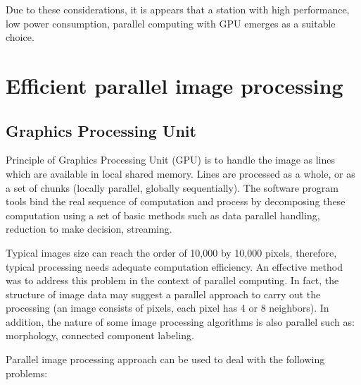 \documentclass[10pt,a4paper]{article}
\begin{document}
Due to these considerations, it is appears that a station with high performance, low power consumption, parallel computing with GPU emerges as a suitable choice.

\section {Efficient parallel image processing }

\subsection {Graphics Processing Unit}

Principle of Graphics Processing Unit (GPU) is to handle the image as lines which are available in local shared memory. Lines are processed as a whole, or as a set of chunks (locally parallel, globally sequentially). The software program tools bind the real sequence of computation and process by decomposing these computation using a set of basic methods such as data parallel handling, reduction to make decision, streaming.

\label{Applications}
Typical images size can reach the order of 10,000 by 10,000 pixels, therefore, typical processing needs adequate computation efficiency. 
An effective method was to address this problem in the context of parallel computing. 
In fact, the structure of image data may suggest a parallel approach to carry out the processing (an image consists of pixels, each pixel has 4 or 8 neighbors). 
In addition, the nature of some image processing algorithms is also parallel such as: morphology, connected component labeling. 

Parallel image processing approach can be used to deal with the following problems:
\end{document}
